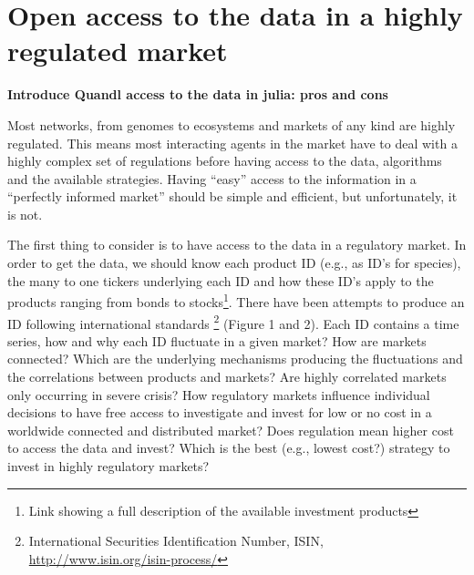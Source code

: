 \documentclass[english,12pt]{article}
\begin{document}

\section{Open access to the data in a highly regulated market}


{\bf Introduce Quandl access to the data in julia: pros and cons}

Most networks, from genomes to ecosystems and markets of any kind are
highly regulated. This means most interacting agents in the market
have to deal with a highly complex set of regulations before having
access to the data, algorithms and the available strategies. Having
``easy'' access to the information in a ``perfectly informed market''
should be simple and efficient, but unfortunately, it is not. 

The first thing to consider is to have access to the data in a regulatory market. 
In order to get the data, we should know each product ID (e.g., as ID's for
species), the many to one tickers underlying each ID and how these
ID's apply to the products ranging from bonds to stocks\footnote{Link
  showing a full description of the available investment
  products}. There have been attempts to produce an ID following
international standards
\footnote{International Securities Identification Number, ISIN, \url{http://www.isin.org/isin-process/}}
 (Figure
1 and 2). Each ID contains a time series, how and why each ID
fluctuate in a given market? How are markets connected? Which are the
underlying mechanisms producing the fluctuations and the correlations
between products and markets? Are highly correlated markets only
occurring in severe crisis? How regulatory markets influence
individual decisions to have free access to investigate and invest for
low or no cost in a worldwide connected and distributed market? Does
regulation mean higher cost to access the data and invest? Which is
the best (e.g., lowest cost?) strategy to invest in highly regulatory
markets?
\end{document}
